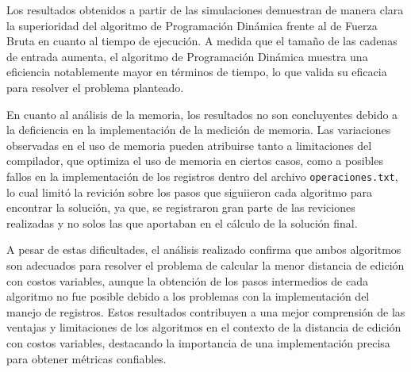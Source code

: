 Los resultados obtenidos a partir de las simulaciones demuestran de manera clara la superioridad del algoritmo de Programación Dinámica frente al de Fuerza Bruta en cuanto al tiempo de ejecución. A medida que el tamaño de las cadenas de entrada aumenta, el algoritmo de Programación Dinámica muestra una eficiencia notablemente mayor en términos de tiempo, lo que valida su eficacia para resolver el problema planteado.

En cuanto al análisis de la memoria, los resultados no son concluyentes debido a la deficiencia en la implementación de la medición de memoria. Las variaciones observadas en el uso de memoria pueden atribuirse tanto a limitaciones del compilador, que optimiza el uso de memoria en ciertos casos, como a posibles fallos en la implementación de los registros dentro del archivo \texttt{operaciones.txt}, lo cual limitó la revición sobre los pasos que siguiieron cada algoritmo para encontrar la solución, ya que, se registraron gran parte de las reviciones realizadas y no solos las que aportaban en el cálculo de la solución final.

A pesar de estas dificultades, el análisis realizado confirma que ambos algoritmos son adecuados para resolver el problema de calcular la menor distancia de edición con costos variables, aunque la obtención de los pasos intermedios de cada algoritmo no fue posible debido a los problemas con la implementación del manejo de registros. Estos resultados contribuyen a una mejor comprensión de las ventajas y limitaciones de los algoritmos en el contexto de la distancia de edición con costos variables, destacando la importancia de una implementación precisa para obtener métricas confiables.



